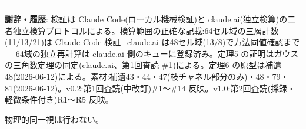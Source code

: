 \documentclass[
]{ltjsarticle}
\begin{document}
\begin{center}\rule{0.5\linewidth}{0.5pt}\end{center}

\textbf{謝辞・履歴}: 検証は Claude Code(ローカル機械検証)と
claude.ai(独立検算)の二者独立検算プロトコルによる。検算範囲の正確な記載:64セル域の三層計数(11/13/21)は
Claude Code 検証+claude.ai は48セル域(13/8)で方法同値確認まで ---
64域の独立再計算は claude.ai 側のキューに登録済み。定理5
の証明はガウスの三角数定理の同定(claude.ai、第1回査読 \#1)による。定理6
の原型は補遺48(2026-06-12)による。素材:補遺43・44・47(枝チャネル部分のみ)・48・79・81(2026-06-12)。v0.2:第1回査読(中改訂)\#1〜\#14
反映。v1.0:第2回査読(採録・軽微条件付き)R1〜R5 反映。

物理的同一視は行わない。
\end{document}

